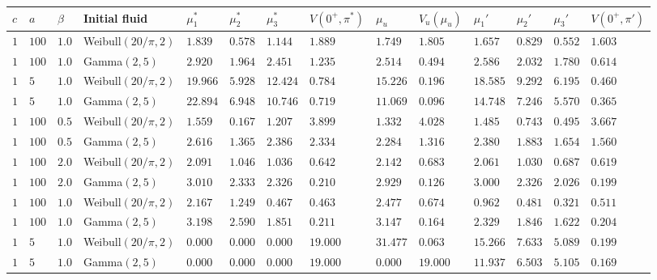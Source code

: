 \documentclass[a4paper]{thesis}
\theoremstyle{definition}
\begin{document}
\begin{appendices}
\begin{landscape}
	\begin{table}[H]
		\centering
		\begin{tabularx}{\linewidth}{llllllllllllll}
			$c$& $a$ & $\beta$ & Initial fluid & $\mu_1^*$ & $\mu_2^*$ & $\mu_3^*$ & $V(0^+,\pi^*)$ & $\mu_u$ & $V_u(\mu_u)$ &$\mu_1'$ & $\mu_2'$ & $\mu_3'$ &$V(0^+,\pi')$  \\
			\hline    
			$1$ & $100$ & $1.0$ & Weibull$(20/\pi,2)$ & $1.839$ & $0.578$ & $1.144$ & $1.889$ & $1.749$ & $1.805$ & $1.657$ & $0.829$ & $0.552$ & $1.603$ \\ 
			$1$ & $100$ & $1.0$ & Gamma$(2,5)$ & $2.920$ & $1.964$ & $2.451$ & $1.235$ & $2.514$ & $0.494$ & $2.586$ & $2.032$ & $1.780$ & $0.614$ \\ 
			$1$ & $5$ & $1.0$ & Weibull$(20/\pi,2)$ & $19.966$ & $5.928$ & $12.424$ & $0.784$ & $15.226$ & $0.196$ & $18.585$ & $9.292$ & $6.195$ & $0.460$ \\ 
			$1$ & $5$ & $1.0$ & Gamma$(2,5)$ & $22.894$ & $6.948$ & $10.746$ & $0.719$ & $11.069$ & $0.096$ & $14.748$ & $7.246$ & $5.570$ & $0.365$ \\ 
			$1$ & $100$ & $0.5$ & Weibull$(20/\pi,2)$ & $1.559$ & $0.167$ & $1.207$ & $3.899$ & $1.332$ & $4.028$ & $1.485$ & $0.743$ & $0.495$ & $3.667$ \\ 
			$1$ & $100$ & $0.5$ & Gamma$(2,5)$ & $2.616$ & $1.365$ & $2.386$ & $2.334$ & $2.284$ & $1.316$ & $2.380$ & $1.883$ & $1.654$ & $1.560$ \\ 
			$1$ & $100$ & $2.0$ & Weibull$(20/\pi,2)$ & $2.091$ & $1.046$ & $1.036$ & $0.642$ & $2.142$ & $0.683$ & $2.061$ & $1.030$ & $0.687$ & $0.619$ \\ 
			$1$ & $100$ & $2.0$ & Gamma$(2,5)$ & $3.010$ & $2.333$ & $2.326$ & $0.210$ & $2.929$ & $0.126$ & $3.000$ & $2.326$ & $2.026$ & $0.199$ \\ 
			$1$ & $100$ & $1.0$ & Weibull$(20/\pi,2)$ & $2.167$ & $1.249$ & $0.467$ & $0.463$ & $2.477$ & $0.674$ & $0.962$ & $0.481$ & $0.321$ & $0.511$ \\ 
			$1$ & $100$ & $1.0$ & Gamma$(2,5)$ & $3.198$ & $2.590$ & $1.851$ & $0.211$ & $3.147$ & $0.164$ & $2.329$ & $1.846$ & $1.622$ & $0.204$ \\ 
			$1$ & $5$ & $1.0$ & Weibull$(20/\pi,2)$ & $0.000$ & $0.000$ & $0.000$ & $19.000$ & $31.477$ & $0.063$ & $15.266$ & $7.633$ & $5.089$ & $0.199$ \\ 
			$1$ & $5$ & $1.0$ & Gamma$(2,5)$ & $0.000$ & $0.000$ & $0.000$ & $19.000$ & $0.000$ & $19.000$ & $11.937$ & $6.503$ & $5.105$ & $0.169$ \\ 

\end{tabularx}
\end{table}
\end{landscape}
\end{appendices}
\end{document}
